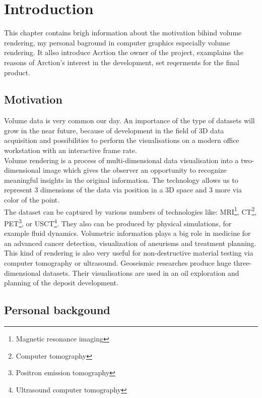 \documentclass[english, 11pt]{report}
\begin{document}
\newpage

\tableofcontents

\chapter{Introduction}
This chapter contains brigh information about the motivation bihind volume rendering, my personal baground in computer graphics especially volume rendering. It allso introduce Acrtion the owner of the project, examplains the reasons of Arction's interest in the development, set reqerments for the final product.
\section{Motivation}

Volume data is very common our day. An importance of the type of datasets will grow in the near future, because of development in the field of 3D data acquisition and possibilities to perform the visualisations on a modern office workstation with an interactive frame rate.\\

Volume rendering is a process of multi-dimensional data visualisation into a two-dimensional image which gives the observer an opportunity to recognize meaningful insights in the original information. The technology allows us to represent 3 dimensions of the data via position in a 3D space and 3 more via color of the point.\\

The dataset can be captured by various numbers of technologies like: MRI\footnote{Magnetic resonance imaging}, CT\footnote{Computer tomography}, PET\footnote{Positron emission tomography}, or USCT\footnote{Ultrasound computer tomography}. They also can be produced by physical simulations, for example fluid dynamics. Volumetric information plays a big role in medicine for an advanced cancer detection, visualization of aneurisms and treatment planning. This kind of rendering is also very useful for non-destructive material testing via computer tomography or ultrasound. Geoseismic researches produce huge three-dimensional datasets. Their visualisations are used in an oil exploration and planning of the deposit development.\\

\section{Personal backgound}
\end{document}
